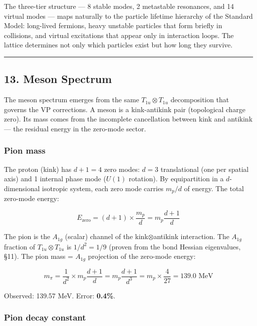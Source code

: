 \documentclass[
]{article}
\begin{document}
The three-tier structure --- 8 stable modes, 2 metastable resonances,
and 14 virtual modes --- maps naturally to the particle lifetime
hierarchy of the Standard Model: long-lived fermions, heavy unstable
particles that form briefly in collisions, and virtual excitations that
appear only in interaction loops. The lattice determines not only which
particles exist but how long they survive.

\begin{center}\rule{0.5\linewidth}{0.5pt}\end{center}

\subsection{13. Meson Spectrum}\label{meson-spectrum}

The meson spectrum emerges from the same \(T_{1u} \otimes T_{1u}\)
decomposition that governs the VP corrections. A meson is a
kink-antikink pair (topological charge zero). Its mass comes from the
incomplete cancellation between kink and antikink --- the residual
energy in the zero-mode sector.

\subsubsection{Pion mass}\label{pion-mass}

The proton (kink) has \(d+1 = 4\) zero modes: \(d = 3\) translational
(one per spatial axis) and 1 internal phase mode (\(U(1)\) rotation). By
equipartition in a \(d\)-dimensional isotropic system, each zero mode
carries \(m_p/d\) of energy. The total zero-mode energy:

\[E_{\text{zero}} = (d+1) \times \frac{m_p}{d} = m_p \frac{d+1}{d}\]

The pion is the \(A_{1g}\) (scalar) channel of the
kink\(\otimes\)antikink interaction. The \(A_{1g}\) fraction of
\(T_{1u} \otimes T_{1u}\) is \(1/d^2 = 1/9\) (proven from the bond
Hessian eigenvalues, §11). The pion mass = \(A_{1g}\) projection of the
zero-mode energy:

\[m_\pi = \frac{1}{d^2} \times m_p \frac{d+1}{d} = m_p \frac{d+1}{d^3} = m_p \times \frac{4}{27} = 139.0 \text{ MeV}\]

Observed: 139.57 MeV. Error: \textbf{0.4\%}.

\subsubsection{Pion decay constant}\label{pion-decay-constant}
\end{document}
